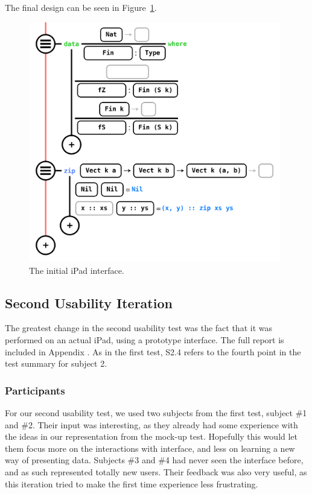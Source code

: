 The final design can be seen in Figure~\ref{fig:initialiPadInterface}.

\begin{figure}
	\centering
		\includegraphics[width=110mm]{diagrams/ipad_interface.PNG}
	\caption{The initial iPad interface.}
\label{fig:initialiPadInterface}
\end{figure}

\subsection{Second Usability Iteration}
\label{sec:SecondUsabilityTest}
The greatest change in the second usability test was the fact that it was
performed on an actual iPad, using a prototype interface. The full report is
included in Appendix . As in the first test, S2.4 refers to
the fourth point in the test summary for subject 2.

\subsubsection{Participants}
For our second usability test, we used two subjects from the first test,
subject \#1 and \#2. Their input was interesting, as they already had some
experience with the ideas in our representation from the mock-up test.
Hopefully this would let them focus more on the interactions with interface,
and less on learning a new way of presenting data. Subjects \#3 and \#4 had
never seen the interface before, and as such represented totally new users.
Their feedback was also very useful, as this iteration tried to make the first
time experience less frustrating.

